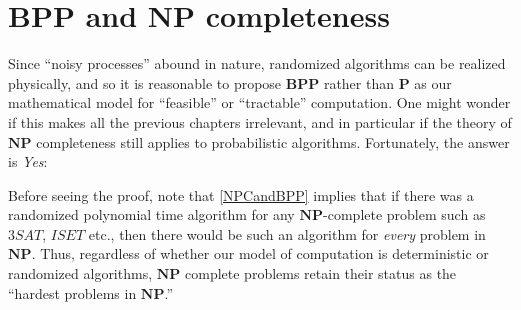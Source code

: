 \section{\(\mathbf{BPP}\) and \(\mathbf{NP}\)
completeness}\label{mathbfBPP-and-mathbfNP-co}

Since ``noisy processes'' abound in nature, randomized algorithms can be
realized physically, and so it is reasonable to propose \(\mathbf{BPP}\)
rather than \(\mathbf{P}\) as our mathematical model for ``feasible'' or
``tractable'' computation. One might wonder if this makes all the
previous chapters irrelevant, and in particular if the theory of
\(\mathbf{NP}\) completeness still applies to probabilistic algorithms.
Fortunately, the answer is \emph{Yes}:

\hypertarget{NPCandBPP}{}

Before seeing the proof, note that \cref{NPCandBPP} implies that if
there was a randomized polynomial time algorithm for any
\(\mathbf{NP}\)-complete problem such as \(3\ensuremath{\mathit{SAT}}\),
\(\ensuremath{\mathit{ISET}}\) etc., then there would be such an
algorithm for \emph{every} problem in \(\mathbf{NP}\). Thus, regardless
of whether our model of computation is deterministic or randomized
algorithms, \(\mathbf{NP}\) complete problems retain their status as the
``hardest problems in \(\mathbf{NP}\).''


